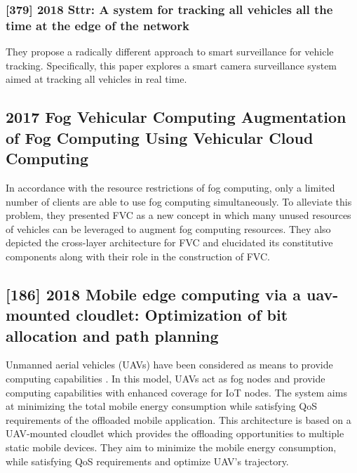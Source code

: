 \subsubsection{[379] 2018 Sttr: A system for tracking all vehicles all the time at the edge of the network}
They propose a radically different approach to smart surveillance for vehicle tracking. Specifically, this paper explores a smart camera surveillance system aimed at tracking all vehicles in real time.

\subsection{2017 Fog Vehicular Computing Augmentation of Fog Computing Using Vehicular Cloud Computing}
In accordance with the resource restrictions of fog computing, only a limited number of clients are able to use fog computing simultaneously. To alleviate this problem, they presented FVC as a new concept in which many unused resources of vehicles can be leveraged to augment fog computing resources. They also depicted the cross-layer architecture for FVC and elucidated its constitutive components along with their role in the construction of FVC.

\subsection{[186] 2018 Mobile edge computing via a uav-mounted cloudlet: Optimization of bit allocation and path planning}
\label{subsec:paper06}
Unmanned aerial vehicles (UAVs) have been considered as means to provide computing capabilities \cite{jeong2018mobile}. In this model, UAVs act as fog nodes and provide computing capabilities with enhanced coverage for IoT nodes. The system aims at minimizing the total mobile energy consumption while satisfying QoS requirements of the offloaded mobile application. This architecture is based on a UAV-mounted cloudlet which provides the offloading opportunities to multiple static mobile devices. They aim to minimize the mobile energy consumption, while satisfying QoS requirements and optimize UAV’s trajectory.

